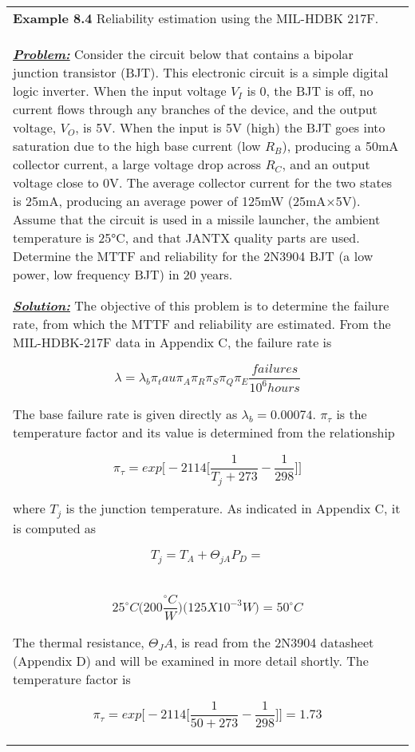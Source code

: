 \begin{table}
\begin{tabular}{m{15cm}|}
\textbf{\hfill\break Example 8.4}
Reliability estimation using the MIL-HDBK 217F. \\

\emph{\textbf{\ul{Problem:}}} Consider the circuit below that contains a
bipolar junction transistor (BJT). This electronic circuit is a simple
digital logic inverter. When the input voltage $V_I$ is 0, 
the BJT is off, no current
flows through any branches of the device, and the output voltage,
$V_O$, is 5V. When the input is 5V
(high) the BJT goes into saturation due to the high base current (low
$R_B$), producing a 50mA collector
current, a large voltage drop across $R_C$, and an output
voltage close to 0V. The average collector current for the two states is
25mA, producing an average power of 125mW (25mA×5V). Assume that the
circuit is used in a missile launcher, the ambient temperature is 25°C,
and that JANTX quality parts are used. Determine the MTTF and
reliability for the 2N3904 BJT (a low power, low frequency BJT) in 20
years.



\emph{\textbf{\ul{Solution:}}} The objective of this problem is to
determine the failure rate, from which the MTTF and reliability are
estimated. From the MIL-HDBK-217F data in Appendix C, the failure rate
is


$$\lambda=\lambda_b \pi_tau \pi_A \pi_R \pi_S \pi_Q \pi_E \frac{failures}{10^6 hours}$$


The base failure rate is given directly as
$\lambda_b = 0.00074$.   $\pi_\tau$ is the temperature factor and
its value is determined from the relationship

$$\pi_\tau = exp \big[-2114 \big[ \frac{1}{T_j + 273} - \frac{1}{298} \big] \big]$$

where $T_j$ is the junction temperature. As
indicated in Appendix C, it is computed as

$$T_j = T_A + \Theta_{jA}P_D = $$ \\
$$		25^\circ C \big( 200 \frac{^\circ C}{W} \big) \big(125 X 10^{-3}W \big) = 50^\circ C $$

The thermal resistance, $\Theta_JA$, is read
from the 2N3904 datasheet (Appendix D) and will be examined in more
detail shortly. The temperature factor is

$$\pi_\tau = exp \big[-2114 \big[ \frac{1}{50 + 273} - \frac{1}{298} \big] \big] = 1.73$$


\end{tabular}
\end{table}
